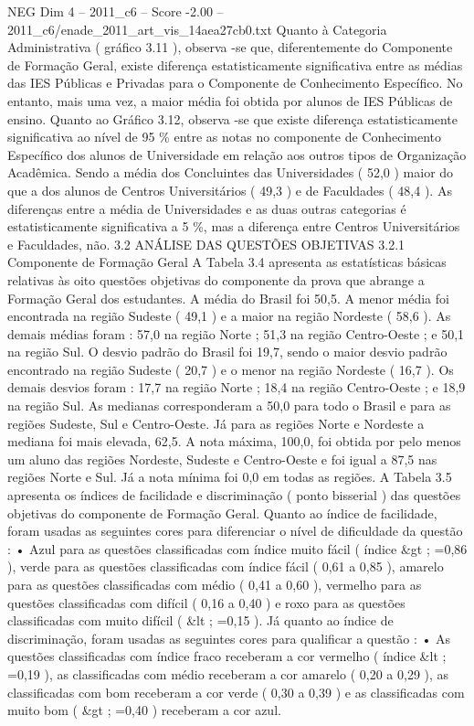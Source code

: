 \begin{textsample}{NEG Dim 4 – 2011\_c6 – Score -2.00 – 2011\_c6/enade\_2011\_art\_vis\_14aea27cb0.txt}
Quanto à Categoria Administrativa ( gráfico 3.11 ), observa -se que, diferentemente do Componente de Formação Geral, existe diferença estatisticamente significativa entre as médias das IES Públicas e Privadas para o Componente de Conhecimento Específico.
No entanto, mais uma vez, a maior média foi obtida por alunos de IES Públicas de ensino.
Quanto ao Gráfico 3.12, observa -se que existe diferença estatisticamente significativa ao nível de 95 \% entre as notas no componente de Conhecimento Específico dos alunos de Universidade em relação aos outros tipos de Organização Acadêmica.
Sendo a média dos Concluintes das Universidades ( 52,0 ) maior do que a dos alunos de Centros Universitários ( 49,3 ) e de Faculdades ( 48,4 ).
As diferenças entre a média de Universidades e as duas outras categorias é estatisticamente significativa a 5 \%, mas a diferença entre Centros Universitários e Faculdades, não. 3.2 ANÁLISE DAS QUESTÕES OBJETIVAS 3.2.1 Componente de Formação Geral A Tabela 3.4 apresenta as estatísticas básicas relativas às oito questões objetivas do componente da prova que abrange a Formação Geral dos estudantes.
A média do Brasil foi 50,5.
A menor média foi encontrada na região Sudeste ( 49,1 ) e a maior na região Nordeste ( 58,6 ).
As demais médias foram : 57,0 na região Norte ; 51,3 na região Centro-Oeste ; e 50,1 na região Sul.
O desvio padrão do Brasil foi 19,7, sendo o maior desvio padrão encontrado na região Sudeste ( 20,7 ) e o menor na região Nordeste ( 16,7 ).
Os demais desvios foram : 17,7 na região Norte ; 18,4 na região Centro-Oeste ; e 18,9 na região Sul.
As medianas corresponderam a 50,0 para todo o Brasil e para as regiões Sudeste, Sul e Centro-Oeste.
Já para as regiões Norte e Nordeste a mediana foi mais elevada, 62,5.
A nota máxima, 100,0, foi obtida por pelo menos um aluno das regiões Nordeste, Sudeste e Centro-Oeste e foi igual a 87,5 nas regiões Norte e Sul.
Já a nota mínima foi 0,0 em todas as regiões.
A Tabela 3.5 apresenta os índices de facilidade e discriminação ( ponto bisserial ) das questões objetivas do componente de Formação Geral.
Quanto ao índice de facilidade, foram usadas as seguintes cores para diferenciar o nível de dificuldade da questão : • Azul para as questões classificadas com índice muito fácil ( índice \&gt ; =0,86 ), verde para as questões classificadas com índice fácil ( 0,61 a 0,85 ), amarelo para as questões classificadas com médio ( 0,41 a 0,60 ), vermelho para as questões classificadas com difícil ( 0,16 a 0,40 ) e roxo para as questões classificadas com muito difícil ( \&lt ; =0,15 ).
Já quanto ao índice de discriminação, foram usadas as seguintes cores para qualificar a questão : • As questões classificadas com índice fraco receberam a cor vermelho ( índice \&lt ; =0,19 ), as classificadas com médio receberam a cor amarelo ( 0,20 a 0,29 ), as classificadas com bom receberam a cor verde ( 0,30 a 0,39 ) e as classificadas com muito bom ( \&gt ; =0,40 ) receberam a cor azul.

\end{textsample}
